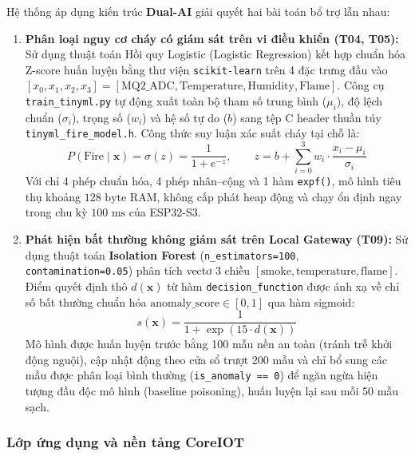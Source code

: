 Hệ thống áp dụng kiến trúc \textbf{Dual-AI} giải quyết hai bài toán bổ trợ lẫn nhau:

\begin{enumerate}[leftmargin=*, itemsep=3pt]
  \item \textbf{Phân loại nguy cơ cháy có giám sát trên vi điều khiển (T04, T05):} Sử dụng thuật toán Hồi quy Logistic (Logistic Regression) kết hợp chuẩn hóa Z-score huấn luyện bằng thư viện \texttt{scikit-learn} \cite{ref_sklearn} trên 4 đặc trưng đầu vào $[x_0, x_1, x_2, x_3] = [\text{MQ2\_ADC}, \text{Temperature}, \text{Humidity}, \text{Flame}]$. Công cụ \texttt{train\_tinyml.py} tự động xuất toàn bộ tham số trung bình ($\mu_i$), độ lệch chuẩn ($\sigma_i$), trọng số ($w_i$) và hệ số tự do ($b$) sang tệp C header thuần túy \texttt{tinyml\_fire\_model.h}. Công thức suy luận xác suất cháy tại chỗ là:
  \begin{equation}
    P(\text{Fire} \mid \mathbf{x}) = \sigma(z) = \frac{1}{1 + e^{-z}}, \qquad z = b + \sum_{i=0}^{3} w_i \cdot \frac{x_i - \mu_i}{\sigma_i}
    \label{eq:tinyml-logistic}
  \end{equation}
  Với chỉ 4 phép chuẩn hóa, 4 phép nhân--cộng và 1 hàm \texttt{expf()}, mô hình tiêu thụ khoảng $128\text{ byte}$ RAM, không cấp phát heap động và chạy ổn định ngay trong chu kỳ $100\text{ ms}$ của ESP32-S3.
  \item \textbf{Phát hiện bất thường không giám sát trên Local Gateway (T09):} Sử dụng thuật toán \textbf{Isolation Forest} \cite{ref_iforest} (\texttt{n\_estimators=100}, \texttt{contamination=0.05}) phân tích vectơ 3 chiều $[\text{smoke}, \text{temperature}, \text{flame}]$. Điểm quyết định thô $d(\mathbf{x})$ từ hàm \texttt{decision\_function} được ánh xạ về chỉ số bất thường chuẩn hóa $\text{anomaly\_score} \in [0, 1]$ qua hàm sigmoid:
  \begin{equation}
    s(\mathbf{x}) = \frac{1}{1 + \exp(15 \cdot d(\mathbf{x}))}
    \label{eq:iforest-score}
  \end{equation}
  Mô hình được huấn luyện trước bằng 100 mẫu nền an toàn (tránh trễ khởi động nguội), cập nhật động theo cửa sổ trượt 200 mẫu và chỉ bổ sung các mẫu được phân loại bình thường (\texttt{is\_anomaly == 0}) để ngăn ngừa hiện tượng đầu độc mô hình (baseline poisoning), huấn luyện lại sau mỗi 50 mẫu sạch.
\end{enumerate}

\subsubsection{Lớp ứng dụng và nền tảng CoreIOT}
\label{subsubsec:lop-coreiot}

